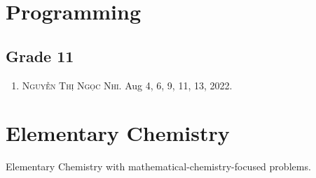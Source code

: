 \documentclass{article}
\numberwithin{equation}{section}
\begin{document}
\section{Programming}

\subsection{Grade 11}
\begin{enumerate}
	\item \textsc{Nguyễn Thị Ngọc Nhi.} Aug 4, 6, 9, 11, 13, 2022.
\end{enumerate}

\section{Elementary Chemistry}
Elementary Chemistry with mathematical-chemistry-focused problems.


\printbibliography[heading=bibintoc]
	
\end{document}
